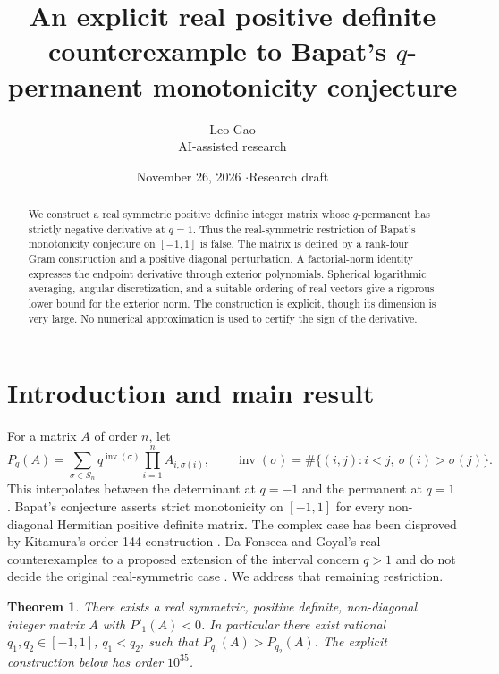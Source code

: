 \documentclass[11pt]{article}
\title{An explicit real positive definite counterexample to Bapat's $q$-permanent monotonicity conjecture}
\author{Leo Gao\\[-1pt]{\small AI-assisted research}}
\date{November 26, 2026 \quad$\cdot$\quad Research draft}
\newtheorem{theorem}{Theorem}
\newcommand{\inv}{\operatorname{inv}}
\begin{document}
\maketitle
\begin{abstract}
We construct a real symmetric positive definite integer matrix whose $q$-permanent has strictly negative derivative at $q=1$. Thus the real-symmetric restriction of Bapat's monotonicity conjecture on $[-1,1]$ is false. The matrix is defined by a rank-four Gram construction and a positive diagonal perturbation. A factorial-norm identity expresses the endpoint derivative through exterior polynomials. Spherical logarithmic averaging, angular discretization, and a suitable ordering of real vectors give a rigorous lower bound for the exterior norm. The construction is explicit, though its dimension is very large. No numerical approximation is used to certify the sign of the derivative.
\end{abstract}

\section{Introduction and main result}
For a matrix $A$ of order $n$, let
\[
 P_q(A)=\sum_{\sigma\in S_n}q^{\inv(\sigma)}\prod_{i=1}^n A_{i,\sigma(i)},\qquad
 \inv(\sigma)=\#\{(i,j):i<j,\ \sigma(i)>\sigma(j)\}.
\]
This interpolates between the determinant at $q=-1$ and the permanent at $q=1$. Bapat's conjecture \cite{bapat,bapatlal} asserts strict monotonicity on $[-1,1]$ for every non-diagonal Hermitian positive definite matrix. The complex case has been disproved by Kitamura's order-144 construction \cite{kitamura}. Da Fonseca and Goyal's real counterexamples to a proposed extension of the interval concern $q>1$ and do not decide the original real-symmetric case \cite{fg}. We address that remaining restriction.

\begin{theorem}\label{main}
There exists a real symmetric, positive definite, non-diagonal integer matrix $A$ with $P'_1(A)<0$. In particular there exist rational $q_1,q_2\in[-1,1]$, $q_1<q_2$, such that $P_{q_1}(A)>P_{q_2}(A)$. The explicit construction below has order $10^{35}$.
\end{theorem}
\end{document}
